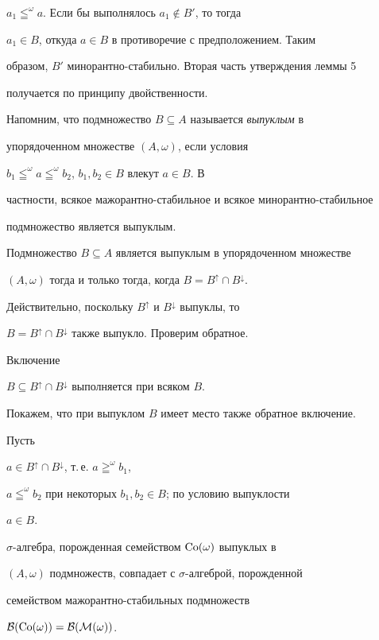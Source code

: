 $a_1\leqq^\omega a$. Если бы выполнялось $a_1\notin B'$, то тогда 


$a_1\in B$, откуда $a\in B$ в противоречие с предположением. Таким 


образом, $B'$ минорантно-стабильно. Вторая часть утверждения леммы 5 


получается по принципу двойственности. 


 


Напомним, что подмножество $B\subseteq A$ называется {\it выпуклым} в 


упорядоченном множестве $(A,\omega)$, если условия 


$b_1\leqq^\omega a\leqq^\omega b_2$, $b_1,b_2\in B$ влекут $a\in B$. В 


частности, всякое мажорантно-стабильное и всякое минорантно-стабильное 


подмножество является выпуклым. 


 


\begin{lem} 


Подмножество $B\subseteq A$ является выпуклым в упорядоченном множестве 


$(A,\omega)$ тогда и только тогда, когда $B=B^\uparrow\cap 


B^\downarrow$. 


\end{lem} 


 


Действительно, поскольку $B^\uparrow$ и $B^\downarrow$ выпуклы, то 


$B=B^\uparrow\cap B^\downarrow$ также выпукло. Проверим обратное. 


Включение 


$B\subseteq B^\uparrow\cap B^\downarrow$ выполняется при всяком $B$. 


Покажем, что при выпуклом $B$ имеет место также обратное включение. 


Пусть 


$a\in B^\uparrow\cap B^\downarrow$, т.\,е. $a\geqq^\omega b_1$, 


$a\leqq^\omega b_2$ при некоторых $b_1,b_2\in B$; по условию выпуклости 


$a\in B$. 


 


\begin{cor} 


$\sigma$-алгебра, порожденная семейством $\operatorname{Co}(\omega)$ выпуклых в 


$(A,\omega)$ подмножеств, совпадает с $\sigma$-алгеброй, порожденной 


семейством мажорантно-стабильных подмножеств\linebreak


$\cal B(\operatorname{Co}(\omega))=\cal B(M(\omega))$. 


\end{cor} 


